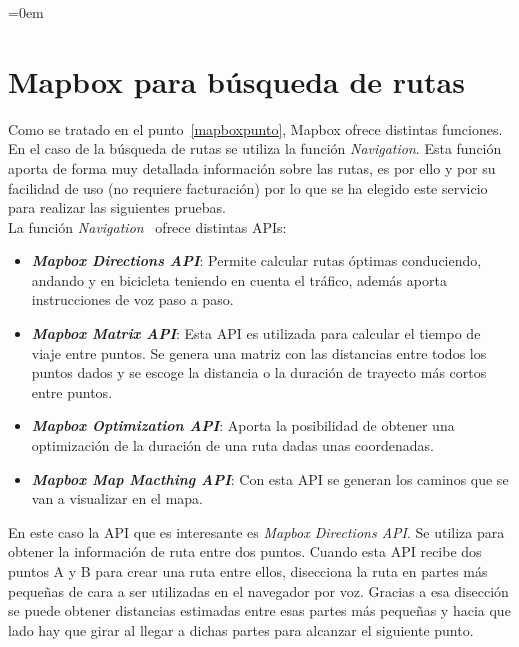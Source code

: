 \parindent=0em
\section{Mapbox para búsqueda de rutas}
\label{mapboxbusquedarutas}
\noindent

Como se tratado en el punto~\ref{mapboxpunto}, Mapbox ofrece distintas funciones. En el caso de la búsqueda de rutas se utiliza la función \textit{Navigation}. Esta función aporta de forma muy detallada información sobre las rutas, es por ello y por su facilidad de uso (no requiere facturación) por lo que se ha elegido este servicio para realizar las siguientes pruebas.\\

La función \textit{Navigation}\footnotemark~ ofrece distintas APIs:

\begin{itemize}
    \item \textbf{\textit{Mapbox Directions API}}: Permite calcular rutas óptimas conduciendo, andando y en bicicleta teniendo en cuenta el tráfico, además aporta instrucciones de voz paso a paso. 
    \item \textbf{\textit{Mapbox Matrix API}}: Esta API es utilizada para calcular el tiempo de viaje entre puntos. Se genera una matriz con las distancias entre todos los puntos dados y se escoge la distancia o la duración de trayecto más cortos entre puntos.
    \item \textbf{\textit{Mapbox Optimization API}}: Aporta la posibilidad de obtener una optimización de la duración de una ruta dadas unas coordenadas.
    \item \textbf{\textit{Mapbox Map Macthing API}}: Con esta API se generan los caminos que se van a visualizar en el mapa.
\end{itemize}


En este caso la API que es interesante es \textit{Mapbox Directions API}. Se utiliza para obtener la información de ruta entre dos puntos. Cuando esta API recibe dos puntos A y B para crear una ruta entre ellos, disecciona la ruta en partes más pequeñas de cara a ser utilizadas en el navegador por voz. Gracias a esa disección se puede obtener distancias estimadas entre esas partes más pequeñas y hacia que lado hay que girar al llegar a dichas partes para alcanzar el siguiente punto.\\

